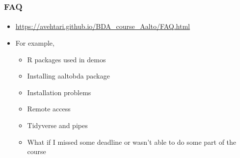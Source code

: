 \documentclass[english,t]{beamer}
\begin{document}
\begin{frame}

  \frametitle{FAQ}  %
  \framesubtitle{}

  \begin{itemize}
  \item {\small\url{https://avehtari.github.io/BDA_course_Aalto/FAQ.html}}
  \item For example,
    \begin{itemize}
    \item R packages used in demos
    \item Installing aaltobda package
    \item Installation problems
    \item Remote access
    \item Tidyverse and pipes
    \item What if I missed some deadline or wasn’t able to do some part of the course
    \end{itemize}
  \end{itemize}
  
\end{frame}  
\end{document}

